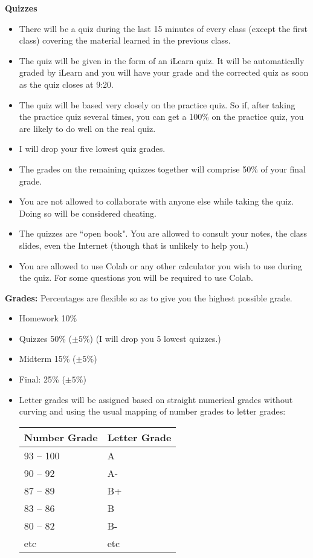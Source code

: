 \documentclass[oneside,12pt]{amsart}
\begin{document}
\bigskip

\textbf{Quizzes}
\begin{itemize}
\item There will be a quiz during the last 15 minutes of every class (except the first class) covering the material
learned in the previous class.
\item The quiz will be given in the form of an iLearn quiz. It will be automatically graded by iLearn and you will
have your grade and the corrected quiz as soon as the quiz closes at 9:20.
\item The quiz will be based very closely on the practice quiz. So if, after taking the practice quiz several times,
you can get a 100\% on the practice quiz, you are likely to do well on the real quiz.
\item I will drop your five lowest quiz grades.
\item The grades on the remaining quizzes together will comprise 50\% of your final grade.
\item You are not allowed to collaborate with anyone else while taking the quiz. Doing so will be considered cheating.
\item The quizzes are ``open book". You are allowed to consult your notes, the class slides, even the Internet (though that is unlikely to help you.)
\item You are allowed to use Colab or any other calculator you wish to use during the quiz. For some questions you will be required to use Colab.
\end{itemize}

\bigskip

\textbf{Grades:} Percentages are flexible so as to give you the highest possible grade.
\begin{itemize}
\item Homework 10\%
\item Quizzes  50\% ($\pm5\%$) (I will drop you 5 lowest quizzes.)
\item Midterm 15\% ($\pm5\%$)
\item Final: 25\% ($\pm5\%$)
\item Letter grades will be assigned based on straight numerical grades
without curving and using the usual mapping of number grades to letter grades:

\begin{center}
  \begin{tabular}{ | l | l |}
    \hline
    Number Grade & Letter Grade  \\ \hline \hline
    93 -- 100 & A\\ \hline
    90 -- 92 & A- \\ \hline
    87 -- 89 & B+ \\ \hline
    83 -- 86 & B \\ \hline
    80 -- 82 & B- \\ \hline
    etc & etc \\ \hline
  \end{tabular}
\end{center}

\end{itemize}
\end{document}
